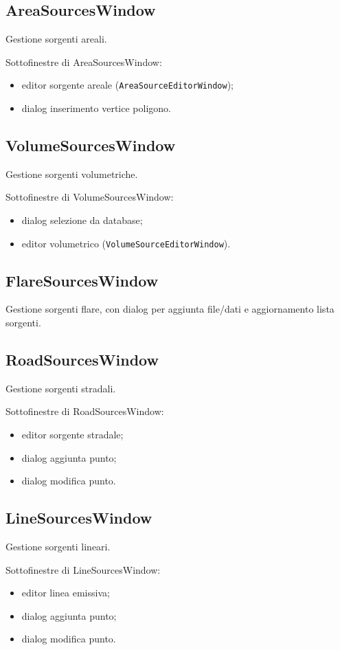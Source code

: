 \subsection{AreaSourcesWindow}
Gestione sorgenti areali.

Sottofinestre di AreaSourcesWindow:
\begin{itemize}[leftmargin=1.5em]
  \item editor sorgente areale (\texttt{AreaSourceEditorWindow});
  \item dialog inserimento vertice poligono.
\end{itemize}

\subsection{VolumeSourcesWindow}
Gestione sorgenti volumetriche.

Sottofinestre di VolumeSourcesWindow:
\begin{itemize}[leftmargin=1.5em]
  \item dialog selezione da database;
  \item editor volumetrico (\texttt{VolumeSourceEditorWindow}).
\end{itemize}

\subsection{FlareSourcesWindow}
Gestione sorgenti flare, con dialog per aggiunta file/dati e aggiornamento lista sorgenti.

\subsection{RoadSourcesWindow}
Gestione sorgenti stradali.

Sottofinestre di RoadSourcesWindow:
\begin{itemize}[leftmargin=1.5em]
  \item editor sorgente stradale;
  \item dialog aggiunta punto;
  \item dialog modifica punto.
\end{itemize}

\subsection{LineSourcesWindow}
Gestione sorgenti lineari.

Sottofinestre di LineSourcesWindow:
\begin{itemize}[leftmargin=1.5em]
  \item editor linea emissiva;
  \item dialog aggiunta punto;
  \item dialog modifica punto.
\end{itemize}

